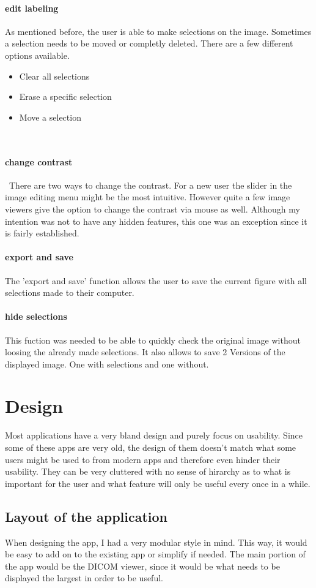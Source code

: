 \paragraph{edit labeling}
As mentioned before, the user is able to make selections on the image. Sometimes a selection needs to be moved or completly deleted. There are a few different options available.
\begin{itemize}
    \item Clear all selections
    \item Erase a specific selection
    \item Move a selection
\end{itemize}
 \paragraph{change contrast}
 There are two ways to change the contrast. For a new user the slider in the image editing menu might be the most intuitive. However quite a few image viewers give the option to change the contrast via mouse as well. Although my intention was not to have any hidden features, this one was an exception since it is fairly established.
\paragraph{export and save}
The 'export and save' function allows the user to save the current figure with all selections made to their computer.
\paragraph{hide selections}
This fuction was needed to be able to quickly check the original image without loosing the already made selections. It also allows to save 2 Versions of the displayed image. One with selections and one without.
\section{Design}
\label{Design}
Most applications have a very bland design and purely focus on usability. Since some of these apps are very old, the design of them doesn't match what some users might be used to from modern apps and therefore even hinder their usability. They can be very cluttered with no sense of hirarchy as to what is important for the user and what feature will only be useful every once in a while.

\subsection{Layout of the application}
\label{Layout of the application}
When designing the app, I had a very modular style in mind. This way, it would be easy to add on to the existing app or simplify if needed. The main portion of the app would be the DICOM viewer, since it would be what needs to be displayed the largest in order to be useful.

